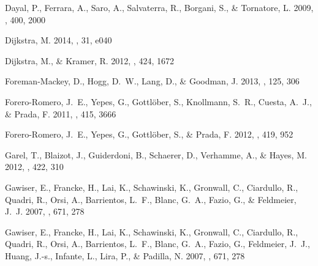 \documentclass{emulateapj}
\begin{document}
\begin{thebibliography}{43}
{Dayal}, P., {Ferrara}, A., {Saro}, A., {Salvaterra}, R., {Borgani}, S., \&
  {Tornatore}, L. 2009, \mnras, 400, 2000

{Dijkstra}, M. 2014, \pasa, 31, e040

{Dijkstra}, M., \& {Kramer}, R. 2012, \mnras, 424, 1672

{Foreman-Mackey}, D., {Hogg}, D.~W., {Lang}, D., \& {Goodman}, J. 2013, \pasp,
  125, 306

{Forero-Romero}, J.~E., {Yepes}, G., {Gottl{\"o}ber}, S., {Knollmann}, S.~R.,
  {Cuesta}, A.~J., \& {Prada}, F. 2011, \mnras, 415, 3666

{Forero-Romero}, J.~E., {Yepes}, G., {Gottl{\"o}ber}, S., \& {Prada}, F. 2012,
  \mnras, 419, 952

{Garel}, T., {Blaizot}, J., {Guiderdoni}, B., {Schaerer}, D., {Verhamme}, A.,
  \& {Hayes}, M. 2012, \mnras, 422, 310

{Gawiser}, E., {Francke}, H., {Lai}, K., {Schawinski}, K., {Gronwall}, C.,
  {Ciardullo}, R., {Quadri}, R., {Orsi}, A., {Barrientos}, L.~F., {Blanc},
  G.~A., {Fazio}, G., \& {Feldmeier}, J.~J. 2007{}, \apj, 671, 278

{Gawiser}, E., {Francke}, H., {Lai}, K., {Schawinski}, K., {Gronwall}, C.,
  {Ciardullo}, R., {Quadri}, R., {Orsi}, A., {Barrientos}, L.~F., {Blanc},
  G.~A., {Fazio}, G., {Feldmeier}, J.~J., {Huang}, J.-s., {Infante}, L.,
  {Lira}, P., \& {Padilla}, N. 2007{}, \apj, 671, 278


\end{thebibliography}
\end{document}
